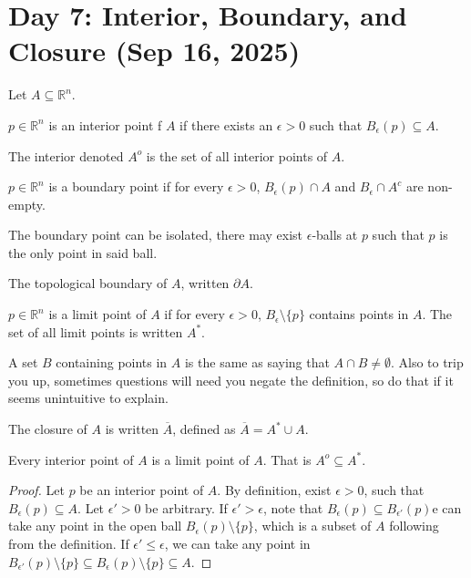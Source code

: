 \section{Day 7: Interior, Boundary, and Closure (Sep 16, 2025)}

Let $A \subseteq \mathbb{R}^n$.

\begin{definition}
    $p \in \mathbb{R}^n$ is an interior point f $A$  if there exists an $\epsilon > 0$ such that $B_ \epsilon (p) \subseteq A$. 
\end{definition}

\begin{definition}[Interior]
The interior denoted $A^o$ is the set of all interior points of $A$. 
\end{definition}

\begin{definition}
    $p \in \mathbb{R}^n$ is a boundary point if for every $\epsilon > 0$, $B_ \epsilon(p) \cap A$ and $B_ \epsilon \cap A^c$ are non-empty.
\end{definition}

The boundary point can be isolated, there may exist $\epsilon$-balls at $p$ such that $p$ is the only point in said ball.

\begin{definition}
The topological boundary of $A$, written $\partial A$.
\end{definition}

\begin{definition}
    $p \in \mathbb{R}^n$ is a limit point of $A$ if for every $\epsilon > 0$, $B_ \epsilon \setminus \{ p \}$ contains points in $A$. The set of all limit points is written $A^*$.
\end{definition}

A set $B$ containing points in $A$ is the same as saying that $A \cap B \ne \emptyset$. Also to trip you up, sometimes questions will need you negate the definition, so do that if it seems unintuitive to explain.

\begin{definition}[Closure]
    The closure of $A$ is written $\overline{A}$, defined as $\overline{A} = A^* \cup A$.
\end{definition}

\begin{simplethm}
Every interior point of $A$ is a limit point of $A$. That is $A^o \subseteq A^*$.
\end{simplethm}
\begin{proof}
    Let $p$ be an interior point of $A$. By definition, exist $\epsilon > 0$, such that $B_ \epsilon (p) \subseteq A$. Let $\epsilon' > 0$ be arbitrary. If $\epsilon' > \epsilon$, note that $B_ \epsilon(p) \subseteq B_{\epsilon'}(p)$e can take any point in the open ball $B_ {\epsilon}(p) \setminus \{ p \}$, which is a subset of $A$ following from the definition. If $\epsilon' \leq \epsilon$, we can take any point in $B_{\epsilon'}(p) \setminus \{ p \} \subseteq B_ \epsilon(p) \setminus \{ p \} \subseteq A$.
\end{proof}

